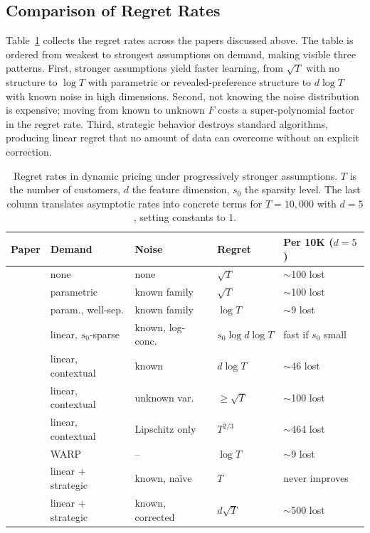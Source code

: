 \subsection{Comparison of Regret Rates}
\label{sec:comparison}

Table~\ref{tab:regret_comparison} collects the regret rates across the papers discussed above. The table is ordered from weakest to strongest assumptions on demand, making visible three patterns. First, stronger assumptions yield faster learning, from $\sqrt{T}$ with no structure to $\log T$ with parametric or revealed-preference structure to $d \log T$ with known noise in high dimensions. Second, not knowing the noise distribution is expensive; moving from known to unknown $F$ costs a super-polynomial factor in the regret rate. Third, strategic behavior destroys standard algorithms, producing linear regret that no amount of data can overcome without an explicit correction.

\begin{table}[!htbp]
\centering
\small
\caption{Regret rates in dynamic pricing under progressively stronger assumptions. $T$ is the number of customers, $d$ the feature dimension, $s_0$ the sparsity level. The last column translates asymptotic rates into concrete terms for $T = 10{,}000$ with $d = 5$, setting constants to 1.}
\label{tab:regret_comparison}
\begin{tabular}{@{}llllp{2.8cm}@{}}
\toprule
Paper & Demand & Noise & Regret & Per 10K ($d{=}5$) \\
\midrule
\citet{Kleinberg2003} & none & none & $\sqrt{T}$ & $\sim$100 lost \\
\citet{Broder2012} & parametric & known family & $\sqrt{T}$ & $\sim$100 lost \\
\citet{Broder2012} & param., well-sep. & known family & $\log T$ & $\sim$9 lost \\
\citet{Javanmard2019} & linear, $s_0$-sparse & known, log-conc. & $s_0 \log d \log T$ & fast if $s_0$ small \\
\citet{Xu2021} & linear, contextual & known & $d \log T$ & $\sim$46 lost \\
\citet{Xu2021} & linear, contextual & unknown var. & $\geq \sqrt{T}$ & $\sim$100 lost \\
\citet{Tullii2024} & linear, contextual & Lipschitz only & $T^{2/3}$ & $\sim$464 lost \\
\citet{Misra2019} & WARP & -- & $\log T$ & $\sim$9 lost \\
\citet{Liu2024strategic} & linear $+$ strategic & known, na\"ive & $T$ & never improves \\
\citet{Liu2024strategic} & linear $+$ strategic & known, corrected & $d\sqrt{T}$ & $\sim$500 lost \\
\bottomrule
\end{tabular}
\end{table}

